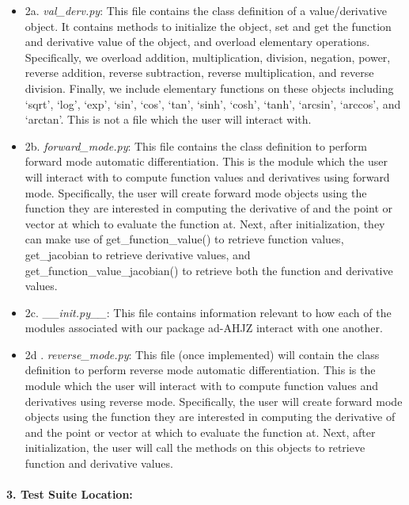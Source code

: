 \documentclass[11pt]{article}
\begin{document}
\begin{itemize}
\item
  2a. \emph{val\_derv.py}: This file contains the class definition of a
  value/derivative object. It contains methods to initialize the object,
  set and get the function and derivative value of the object, and
  overload elementary operations. Specifically, we overload addition,
  multiplication, division, negation, power, reverse addition, reverse
  subtraction, reverse multiplication, and reverse division. Finally, we
  include elementary functions on these objects including `sqrt', `log',
  `exp', `sin', `cos', `tan', `sinh', `cosh', `tanh', `arcsin',
  `arccos', and `arctan'. This is not a file which the user will
  interact with.
\item
  2b. \emph{forward\_mode.py}: This file contains the class definition
  to perform forward mode automatic differentiation. This is the module
  which the user will interact with to compute function values and
  derivatives using forward mode. Specifically, the user will create
  forward mode objects using the function they are interested in
  computing the derivative of and the point or vector at which to
  evaluate the function at. Next, after initialization, they can make
  use of get\_function\_value() to retrieve function values,
  get\_jacobian to retrieve derivative values, and
  get\_function\_value\_jacobian() to retrieve both the function and
  derivative values.
\item
  2c. \_\_\emph{init.py\_\_}: This file contains information relevant to
  how each of the modules associated with our package ad-AHJZ interact
  with one another.
\item
  2d . \emph{reverse\_mode.py}: This file (once implemented) will
  contain the class definition to perform reverse mode automatic
  differentiation. This is the module which the user will interact with
  to compute function values and derivatives using reverse mode.
  Specifically, the user will create forward mode objects using the
  function they are interested in computing the derivative of and the
  point or vector at which to evaluate the function at. Next, after
  initialization, the user will call the methods on this objects to
  retrieve function and derivative values.
\end{itemize}

\hypertarget{test-suite-location}{%
\paragraph{\texorpdfstring{3. \textbf{Test Suite
Location:}}{3. Test Suite Location:}}\label{test-suite-location}}
\end{document}
